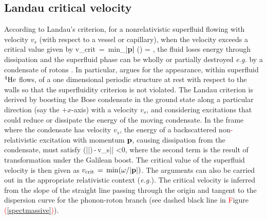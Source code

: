 \subsection{Landau critical velocity}
According to Landau's criterion, for a nonrelativistic superfluid flowing with velocity $v_s$ (with respect to a vessel or capillary), when the velocity exceeds a critical value \cite{Schmitt:2014eka} given by 
\be
v_{\rm crit} \,=\, {\rm min}_{|\bf p|} \left(\frac{\omega(\p)}{|\p|}\right)\,\implies \frac{\partial \omega}{\partial |\p|}\,=\,\frac{\omega}{|\p|}\,,
\ee
the fluid loses energy through dissipation and the superfluid phase can be wholly or partially destroyed \textit{e.g.} by a condensate of rotons \cite{pitaevskii84, voskresenskii93}. In particular, \cite{pitaevskii84} argues for the appearance, within superfluid ${}^4{\rm He}$ flows, of a one dimensional periodic structure at rest with  respect to the walls so that the superfluidity criterion is not violated. The Landau criterion is derived by boosting the Bose condensate in the ground state along a particular direction (say the $+x$-axis) with a velocity $v_s$, and considering excitations that could reduce or dissipate the energy of the moving condensate. In the frame where the condensate has velocity $v_s$, the energy of a backscattered non\textcolor{red}{-}relativistic excitation with momentum ${\bf p}$, causing dissipation  from the condensate, must  satisfy
\be
\omega(|\p|)\,-\,v_s|\p| <0,
\ee
where the second term is the result of  transformation under  the Galilean boost.
The critical value of the superfluid velocity is then given as $v_{\rm crit}\,=\,{\rm min}(\omega/|{\bf p}|)$. The arguments can also be carried out in the appropriate relativistic context (\textit{e.g.}\cite{voskresenskii93, Schmitt:2014eka}). The critical velocity is inferred from the slope of the straight line passing through the origin and tangent to the dispersion curve for the phonon-roton branch (see dashed black line in \textcolor{red}{F}igure \textcolor{red}{(}\ref{spectmassive}\textcolor{red}{)}).

